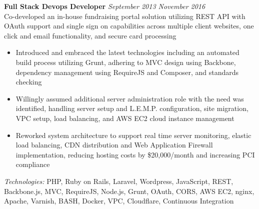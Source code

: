 \documentclass[10pt]{article}
\begin{document}
\begin{addmargin}[1em]{0em}
  \textbf{Full Stack Devops Developer} \hfill \textit{September 2013 \textendash{} November 2016} \\
  Co-developed an in-house fundraising portal solution utilizing REST API with OAuth support and single sign on capabilities across multiple client websites, one click and email functionality, and secure card processing \\
  \vspace{-1.1em}
  \begin{itemize}
    \item Introduced and embraced the latest technologies including an automated build process utilizing Grunt, adhering to MVC design using Backbone, dependency management using RequireJS and Composer, and standards checking
    \item Willingly assumed additional server administration role with the need was identified, handling server setup and L.E.M.P. configuration, site migration, VPC setup, load balancing, and AWS EC2 cloud instance management
    \item Reworked system architecture to support real time server monitoring, elastic load balancing, CDN distribution and Web Application Firewall implementation, reducing hosting costs by \$20,000/month and increasing PCI compliance
  \end{itemize}
  \textit{Technologies:} PHP, Ruby on Rails, Laravel, Wordpress, JavaScript, REST, Backbone.js, MVC, RequireJS, Node.js, Grunt, OAuth, CORS, AWS EC2, nginx, Apache, Varnish, BASH, Docker, VPC, Cloudflare, Continuous Integration
\end{addmargin}
\end{document}
